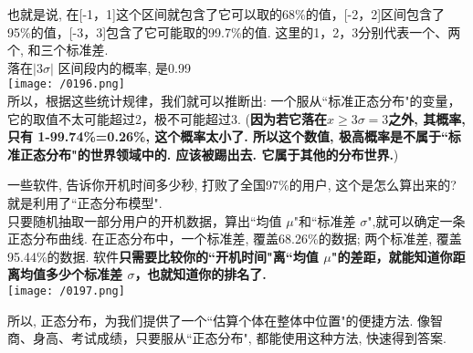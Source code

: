 \documentclass[UTF8]{ctexart}
\begin{document}
也就是说, 在[-1，1]这个区间就包含了它可以取的68\%的值，[-2，2]区间包含了95\%的值，[-3，3]包含了它可能取的99.7\%的值. 这里的1，2，3分别代表一个、两个, 和三个标准差. \\

落在$|3\sigma|$ 区间段内的概率, 是0.99 \\
\texttt{[image: /0196.png]}  \\

所以，根据这些统计规律，我们就可以推断出: 一个服从``标准正态分布"的变量，它的取值不太可能超过2，极不可能超过3. (\textbf{因为若它落在$x \geq 3 \sigma = 3$之外, 其概率, 只有 1-99.74\%=0.26\%, 这个概率太小了. 所以这个数值, 极高概率是不属于``标准正态分布"的世界领域中的. 应该被踢出去. 它属于其他的分布世界.}) \\



\begin{myEnvSample}
一些软件, 告诉你开机时间多少秒, 打败了全国97\%的用户, 这个是怎么算出来的? 就是利用了``正态分布模型". \\
只要随机抽取一部分用户的开机数据，算出``均值 $\mu$"和``标准差 $σ$",就可以确定一条正态分布曲线. 在正态分布中，一个标准差, 覆盖68.26\%的数据; 两个标准差, 覆盖95.44\%的数据. 软件\textbf{只需要比较你的``开机时间"离``均值 $\mu$"的差距，就能知道你距离均值多少个标准差 $σ$，也就知道你的排名了.} \\

\texttt{[image: /0197.png]}  
\end{myEnvSample}

所以, 正态分布，为我们提供了一个``估算个体在整体中位置"的便捷方法. 像智商、身高、考试成绩，只要服从``正态分布", 都能使用这种方法, 快速得到答案. \\
\end{document}
